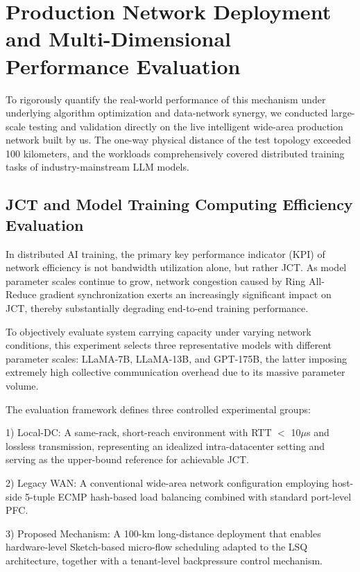 \documentclass[a4paper]{jpconf}
\begin{document}
\section{Production Network Deployment and Multi-Dimensional Performance Evaluation}


To rigorously quantify the real-world performance of this mechanism under underlying algorithm optimization and data-network synergy, we conducted large-scale testing and validation directly on the live intelligent wide-area production network built by us. The one-way physical distance of the test topology exceeded 100 kilometers, and the workloads comprehensively covered distributed training tasks of industry-mainstream LLM models.


\subsection{JCT and Model Training Computing Efficiency Evaluation}


In distributed AI training, the primary key performance indicator (KPI) of network efficiency is not bandwidth utilization alone, but rather JCT. As model parameter scales continue to grow, network congestion caused by Ring All-Reduce gradient synchronization exerts an increasingly significant impact on JCT, thereby substantially degrading end-to-end training performance.


To objectively evaluate system carrying capacity under varying network conditions, this experiment selects three representative models with different parameter scales: LLaMA-7B, LLaMA-13B, and GPT-175B, the latter imposing extremely high collective communication overhead due to its massive parameter volume.


The evaluation framework defines three controlled experimental groups:


1) Local-DC: A same-rack, short-reach environment with RTT $<$ 10$\mu$s and lossless transmission, representing an idealized intra-datacenter setting and serving as the upper-bound reference for achievable JCT.


2) Legacy WAN: A conventional wide-area network configuration employing host-side 5-tuple ECMP hash-based load balancing combined with standard port-level PFC.


3) Proposed Mechanism: A 100-km long-distance deployment that enables hardware-level Sketch-based micro-flow scheduling adapted to the LSQ architecture, together with a tenant-level backpressure control mechanism.
\end{document}
